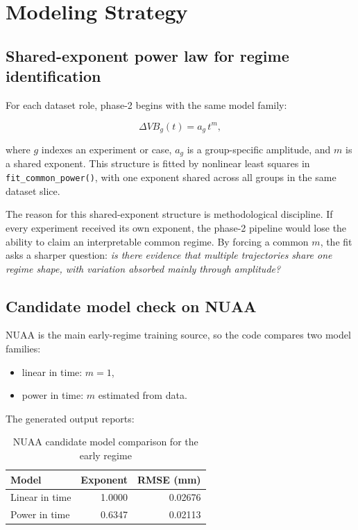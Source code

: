 \documentclass[11pt,a4paper]{article}
\newcommand{\vb}{V\!B}
\newcommand{\code}[1]{\texttt{#1}}
\begin{document}
\section{Modeling Strategy}

\subsection{Shared-exponent power law for regime identification}

For each dataset role, phase-2 begins with the same model family:

\begin{equation}
\Delta \vb_g(t) = a_g \, t^m,
\label{eq:group-power}
\end{equation}

where \(g\) indexes an experiment or case, \(a_g\) is a group-specific amplitude, and \(m\) is a shared exponent.
This structure is fitted by nonlinear least squares in \code{fit\_common\_power()}, with one exponent shared across
all groups in the same dataset slice.

The reason for this shared-exponent structure is methodological discipline. If every experiment received its own
exponent, the phase-2 pipeline would lose the ability to claim an interpretable common regime. By forcing a common
\(m\), the fit asks a sharper question: \emph{is there evidence that multiple trajectories share one regime shape, with
variation absorbed mainly through amplitude?}

\subsection{Candidate model check on NUAA}

NUAA is the main early-regime training source, so the code compares two model families:

\begin{itemize}[leftmargin=1.6em]
\item linear in time: \(m = 1\),
\item power in time: \(m\) estimated from data.
\end{itemize}

The generated output  reports:

\begin{table}[H]
\centering
\caption{NUAA candidate model comparison for the early regime}
\begin{tabular}{lrr}
\toprule
Model & Exponent & RMSE (mm) \\
\midrule
Linear in time & 1.0000 & 0.02676 \\
Power in time & 0.6347 & 0.02113 \\
\bottomrule
\end{tabular}
\end{table}
\end{document}
